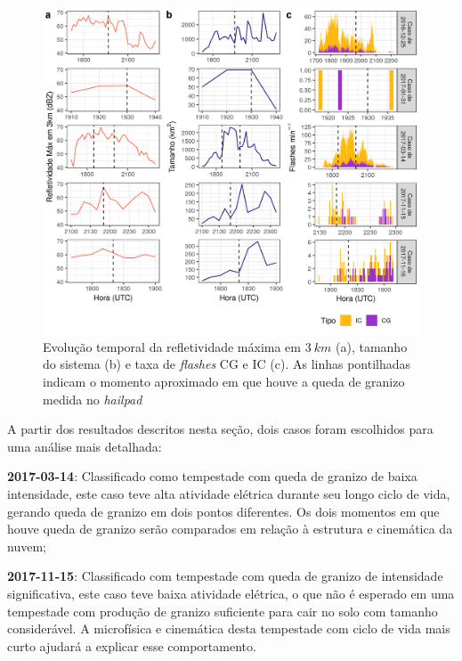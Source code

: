 \begin{figure}[hp]
	\begin{center}
		\caption{Evolução temporal da refletividade máxima em $3\:km$ (a), tamanho do sistema (b) e taxa de \textit{flashes} CG e IC (c). As linhas pontilhadas indicam o momento aproximado em que houve a queda de granizo medida no \textit{hailpad}} 
		\label{painel_ciclo}
		\includegraphics[width=0.99\columnwidth]{../General_Processing/figures/cases_dbz_size_lightning_ptbr.png}
	\end{center}
\end{figure}



A partir dos resultados descritos nesta seção, dois casos foram escolhidos para uma análise mais detalhada:

\begin{alineas}
	\item \textbf{2017-03-14}: Classificado como tempestade com queda de granizo de baixa intensidade, este caso teve alta atividade elétrica durante seu longo ciclo de vida, gerando queda de granizo em dois pontos diferentes. Os dois momentos em que houve queda de granizo serão comparados em relação à estrutura e cinemática da nuvem;
	\item \textbf{2017-11-15}: Classificado com tempestade com queda de granizo de intensidade significativa, este caso teve baixa atividade elétrica, o que não é esperado em uma tempestade com produção de granizo suficiente para cair no solo com tamanho considerável. A microfísica e cinemática desta tempestade com ciclo de vida mais curto ajudará a explicar esse comportamento.
\end{alineas}

